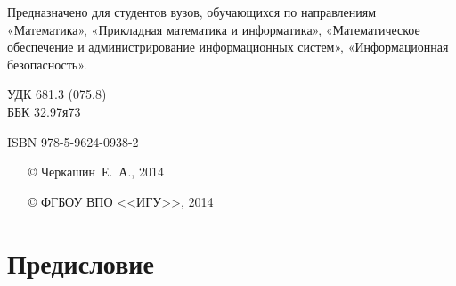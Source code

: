 \documentclass[a4paper,14pt, openany, twoside, final]{extbook} %
\begin{document}
\begin{mygroup}
\begin{minipage}[t]{0.95\linewidth}
Предназначено для студентов вузов, обучающихся по направлениям «Математика», «Прикладная математика и информатика», «Математическое обеспечение и администрирование информационных систем», «Информационная безопасность».




\mbox{}
\endgroup
\end{minipage}
\mbox{}\hspace{0.7\linewidth}
\begin{minipage}{0.3\linewidth}\small
\noindent УДК 681.3 (075.8)\\
\noindent ББК 32.97я73
\end{minipage}

\vfill
\noindent\begin{minipage}[t]{0.35\linewidth}\small
\noindent ISBN 978-5-9624-0938-2
\end{minipage}%
\begin{minipage}[t]{0.65\linewidth}\small
\begin{itemize}
\setlength{\itemsep}{-0.5ex}
\setlength{\parsep}{0pt}
\item[\copyright{}] Черкашин~Е.~А., 2014
\item[\copyright{}] ФГБОУ ВПО <<ИГУ>>, 2014
\end{itemize}
\end{minipage}
\end{mygroup}
\clearpage
\tableofcontents
\clearpage

\newpage
\chapter*{Предисловие}
\end{document}
